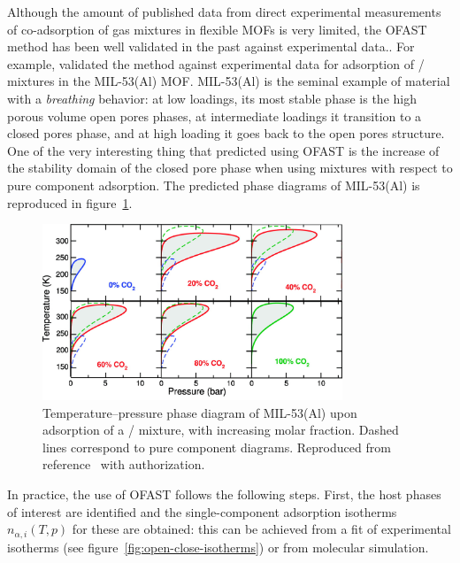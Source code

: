 \documentclass[thesis]{subfiles}
\begin{document}
Although the amount of published data from direct experimental measurements of
co-adsorption of gas mixtures in flexible MOFs is very limited, the OFAST method
has been well validated in the past against experimental data.\cite{Ortiz2011,
Hoffmann2011, Zang2011}. For example, \citeauthor{Ortiz2011}\cite{Ortiz2011}
validated the method against experimental data for adsorption of
/ mixtures in the MIL-53(Al) MOF. MIL-53(Al) is the seminal
example of material with a \emph{breathing} behavior: at low loadings, its most
stable phase is the high porous volume open pores phases, at intermediate
loadings it transition to a closed pores phase, and at high loading it goes back
to the open pores structure. One of the very interesting thing that
\citeauthor{Ortiz2011} predicted using OFAST is the increase of the stability
domain of the closed pore phase when using mixtures with respect to pure
component adsorption. The predicted phase diagrams of MIL-53(Al) is reproduced
in figure~\ref{fig:ofast:ortiz}.

\begin{figure}[ht]
    \centering
    \includegraphics[width=0.8\textwidth]{figures/cited/ofast-phase-diagram-rotated}
    \caption{Temperature–pressure phase diagram of MIL-53(Al) upon adsorption
    of a / mixture, with increasing  molar fraction.
    Dashed lines correspond to pure component diagrams.
    Reproduced from reference~ with authorization.\TODO}
    \label{fig:ofast:ortiz}
\end{figure}

In practice, the use of OFAST follows the following steps. First, the host
phases of interest are identified and the single-component adsorption isotherms
$n_{\alpha,i}(T, p)$ for these are obtained: this can be achieved from a fit of
experimental isotherms (see figure~\ref{fig:open-close-isotherms}) or from
molecular simulation.
\end{document}
